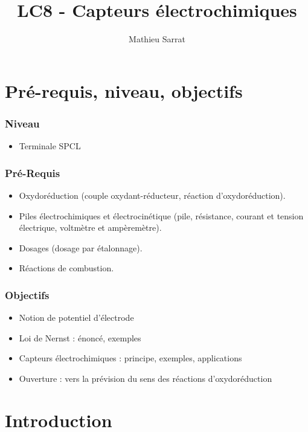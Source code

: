 \documentclass[11pt,a4paper]{report}
\author{Mathieu Sarrat}
\title{LC8 - Capteurs électrochimiques}
\begin{document}
\maketitle

\section*{Pré-requis, niveau, objectifs}

\subsubsection*{Niveau}
\begin{itemize}
	\item Terminale SPCL
\end{itemize}

\subsubsection*{Pré-Requis}
\begin{itemize}
	\item Oxydoréduction (couple oxydant-réducteur, réaction d'oxydoréduction).
	\item Piles électrochimiques et électrocinétique (pile, résistance, courant et tension électrique, voltmètre et ampèremètre).
	\item Dosages (dosage par étalonnage).
	\item Réactions de combustion.
\end{itemize}

\subsubsection*{Objectifs}
\begin{itemize}
	\item Notion de potentiel d'électrode
	\item Loi de Nernst : énoncé, exemples
	\item Capteurs électrochimiques : principe, exemples, applications
	\item Ouverture : vers la prévision du sens des réactions d'oxydoréduction
\end{itemize}

\newpage
\section*{Introduction}
\end{document}
